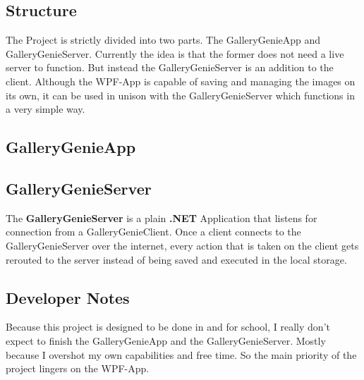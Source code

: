 \documentclass[a4paper,12pt]{article}
\newcommand{\imgal}{GalleryGenie}
\newcommand{\imgalapp}{\imgal App}
\newcommand{\imgalclient}{\imgal Client}
\newcommand{\imgalserver}{\imgal Server}
\begin{document}
\subsection{Structure}
The Project is strictly divided into two parts. The \imgalapp{}  and \imgalserver{}. Currently the idea is that the former does not need a live server to function. But instead the \imgalserver{} is an addition to the client. Although the WPF-App is capable of saving and managing the images on its own, it can be used in unison with the \imgalserver{} which functions in a very simple way.


\subsection{\imgalapp}

\subsection{\imgalserver}
The \textbf{\imgalserver{}} is a plain \textbf{.NET} Application that listens for connection from a \imgalclient{}. Once a client connects to the \imgalserver{} over the internet, every action that is taken on the client gets rerouted to the server instead of being saved and executed in the local storage.
\subsection{Developer Notes}
Because this project is designed to be done in and for school, I really don't expect to finish the \imgalapp{} and the \imgalserver{}. Mostly because I overshot my own capabilities and free time. So the main priority of the project lingers on the WPF-App.
\end{document}
